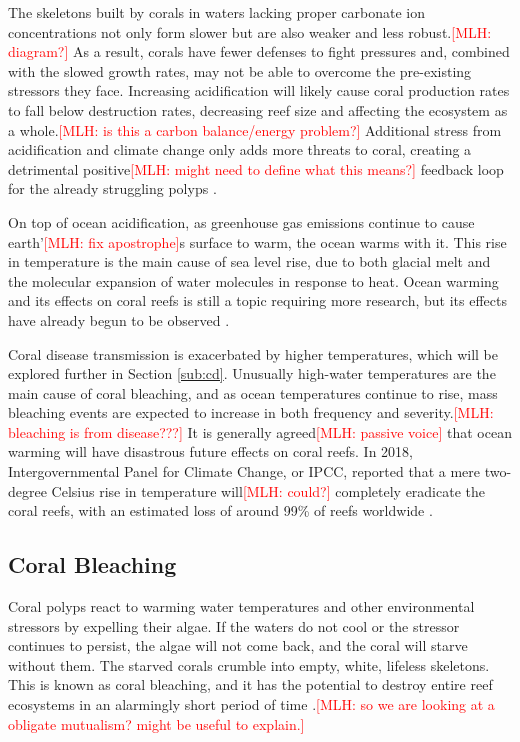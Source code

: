 \documentclass{book}\usepackage{knitr}
\newcommand{\red}[1]{\textcolor{red}{[MLH: #1]}}
\begin{document}
{The skeletons built by corals in waters lacking proper carbonate ion concentrations not only form slower but are also weaker and less robust.\red{diagram?} As a result, corals have fewer defenses to fight pressures and, combined with the slowed growth rates, may not be able to overcome the pre-existing stressors they face. Increasing acidification will likely cause coral production rates to fall below destruction rates, decreasing reef size and affecting the ecosystem as a whole.\red{is this a carbon balance/energy problem?} Additional stress from acidification and climate change only adds more threats to coral, creating a detrimental positive\red{might need to define what this means?} feedback loop for the already struggling polyps \citep{Ayala_2009}.

On top of ocean acidification, as greenhouse gas emissions continue to cause earth’\red{fix apostrophe}s surface to warm, the ocean warms with it. This rise in temperature is the main cause of sea level rise, due to both glacial melt and the molecular expansion of water molecules in response to heat. Ocean warming and its effects on coral reefs is still a topic requiring more research, but its effects have already begun to be observed \citep{wwfindex}.

Coral disease transmission is exacerbated by higher temperatures, which will be explored further in Section \ref{sub:cd}. Unusually high-water temperatures are the main cause of coral bleaching, and as ocean temperatures continue to rise, mass bleaching events are expected to increase in both frequency and severity\citep{Keller2009ClimateCC}.\red{bleaching is from disease???} It is generally agreed\red{passive voice} that ocean warming will have disastrous future effects on coral reefs.  In 2018, Intergovernmental Panel for Climate Change, or IPCC, reported that a mere two-degree Celsius rise in temperature will\red{could?} completely eradicate the coral reefs, with an estimated loss of around 99\% of reefs worldwide \citep{wwfindex}. 

\subsection{Coral Bleaching}

Coral polyps react to warming water temperatures and other environmental stressors by expelling their algae. If the waters do not cool or the stressor continues to persist, the algae will not come back, and the coral will starve without them. The starved corals crumble into empty, white, lifeless skeletons. This is known as coral bleaching, and it has the potential to destroy entire reef ecosystems in an alarmingly short period of time \citep{https://doi.org/10.1111/gcb.14871}.\red{so we are looking at a obligate mutualism?  might be useful to explain.} 

}
\end{document}
